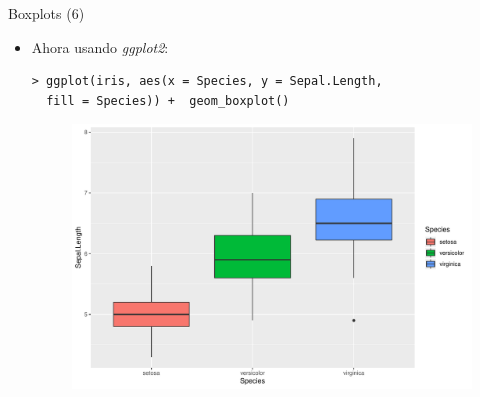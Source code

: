 \documentclass[handout]{beamer}
\begin{document}
\begin{frame}[fragile]{Boxplots (6)}
\scriptsize{
\begin{itemize}

\item Ahora usando \emph{ggplot2}:
\begin{verbatim}
> ggplot(iris, aes(x = Species, y = Sepal.Length, 
  fill = Species)) +  geom_boxplot()
\end{verbatim}

 \begin{figure}[h!]
	\centering
	\includegraphics[scale=0.4]{imagenes/boxplotggplot2.pdf}		
\end{figure} 
 
\end{itemize}

}
\end{frame}
\end{document}
